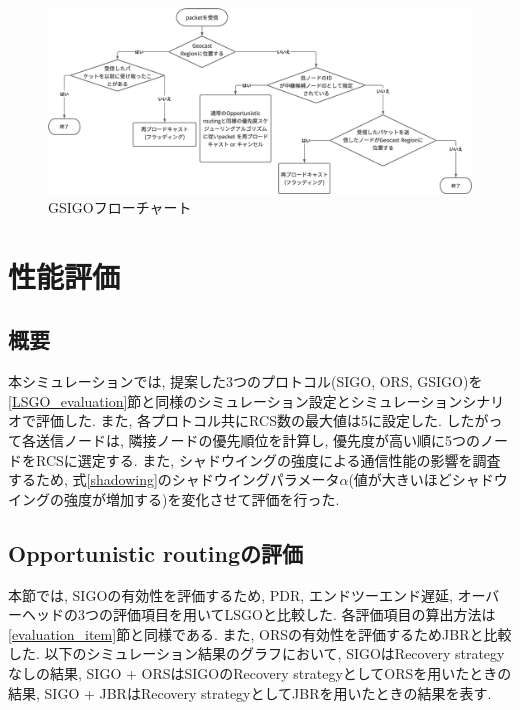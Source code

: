 \documentclass[10pt]{jreport}
\begin{document}
\begin{figure}[!ht]
	\centering
	\includegraphics[width=150mm]{figures/Geocast_flowchart.eps}
	\caption{GSIGOフローチャート}
	\label{fig:Geocast_flowchart}
\end{figure}


\chapter{性能評価}
\label{Evaluation}
\section{概要}
本シミュレーションでは, 提案した3つのプロトコル(SIGO, ORS, GSIGO)を\ref{LSGO_evaluation}節と同様のシミュレーション設定とシミュレーションシナリオで評価した. また, 各プロトコル共にRCS数の最大値は5に設定した. したがって各送信ノードは, 隣接ノードの優先順位を計算し, 優先度が高い順に5つのノードをRCSに選定する. また, シャドウイングの強度による通信性能の影響を調査するため, 式\ref{shadowing}のシャドウイングパラメータ$\alpha$(値が大きいほどシャドウイングの強度が増加する)を変化させて評価を行った. 


\section{Opportunistic routingの評価}
\label{SIGO_evaluation}
本節では, SIGOの有効性を評価するため, PDR, エンドツーエンド遅延, オーバーヘッドの3つの評価項目を用いてLSGOと比較した.
各評価項目の算出方法は\ref{evaluation_item}節と同様である. また, ORSの有効性を評価するためJBRと比較した. 以下のシミュレーション結果のグラフにおいて, SIGOはRecovery strategyなしの結果, SIGO + ORSはSIGOのRecovery strategyとしてORSを用いたときの結果, SIGO + JBRはRecovery strategyとしてJBRを用いたときの結果を表す. 

\end{document}
